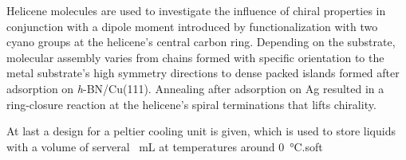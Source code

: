 Helicene molecules are used to investigate the influence of chiral properties in conjunction with a dipole moment introduced by functionalization with two cyano groups at the helicene's central carbon ring. Depending on the substrate, molecular assembly varies from chains formed with specific orientation to the metal substrate's high symmetry directions to dense packed islands formed after adsorption on \textit{h}-BN/Cu(111). Annealing after adsorption on Ag resulted in a ring-closure reaction at the helicene's spiral terminations that lifts chirality.

At last a design for a peltier cooling unit is given, which is used to store liquids with a volume of serveral \SI{}{\milli \liter} at temperatures around \SI{0}{\celsius}.soft